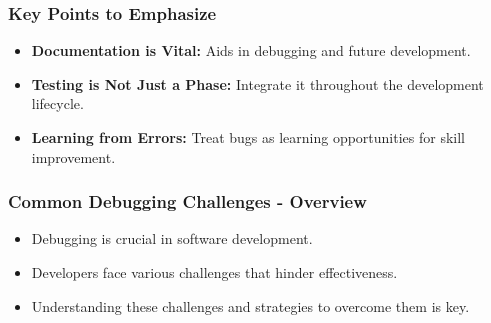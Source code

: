 \documentclass{beamer}
\begin{document}
\begin{frame}
    \frametitle{Key Points to Emphasize}
    \begin{itemize}
        \item \textbf{Documentation is Vital:} Aids in debugging and future development.
        \item \textbf{Testing is Not Just a Phase:} Integrate it throughout the development lifecycle.
        \item \textbf{Learning from Errors:} Treat bugs as learning opportunities for skill improvement.
    \end{itemize}
\end{frame}

\begin{frame}[fragile]
    \frametitle{Common Debugging Challenges - Overview}
    \begin{itemize}
        \item Debugging is crucial in software development.
        \item Developers face various challenges that hinder effectiveness. 
        \item Understanding these challenges and strategies to overcome them is key.
    \end{itemize}
\end{frame}
\end{document}
